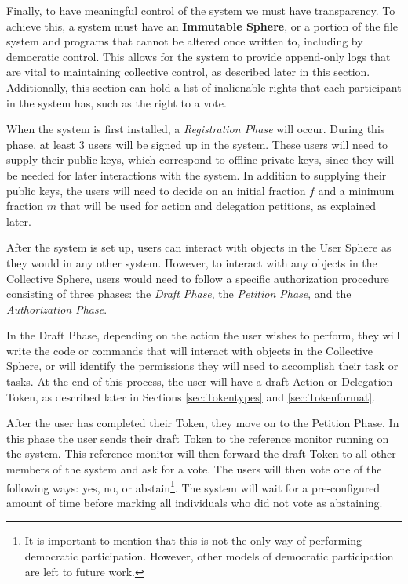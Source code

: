 Finally, to have meaningful control of the system we must have transparency. To
achieve this, a system must have an \textbf{Immutable Sphere}, or a portion of
the file system and programs that cannot be altered once written to, including
by democratic control. This allows for the system to provide append-only logs
that are vital to maintaining collective control, as described later in this
section. Additionally, this section can hold a list of inalienable rights that
each participant in the system has, such as the right to a vote.

When the system is first installed, a \textit{Registration Phase} will occur.
During this phase, at least 3 users will be signed up in the system. These users
will need to supply their public keys, which correspond to offline private keys,
since they will be needed for later interactions with the system. In addition to
supplying their public keys, the users will need to decide on an initial
fraction $f$ and a minimum fraction $m$ that will be used for action and
delegation petitions, as explained later.

After the system is set up, users can interact with objects in the User Sphere
as they would in any other system. However, to interact with any objects in the
Collective Sphere, users would need to follow a specific authorization
procedure consisting of three phases: the \textit{Draft Phase}, the 
\textit{Petition Phase}, and the \textit{Authorization Phase}.

In the Draft Phase, depending on the action the user wishes to perform, they
will write the code or commands that will interact with objects in the
Collective Sphere, or will identify the permissions they will need to accomplish
their task or tasks. At the end of this process, the user will have a draft
Action or Delegation Token, as described later in Sections \ref{sec:Tokentypes}
and \ref{sec:Tokenformat}.

After the user has completed their Token, they move on to the Petition Phase. In
this phase the user sends their draft Token to the reference monitor running on
the system. This reference monitor will then forward the draft Token to all
other members of the system and ask for a vote. The users will then vote one of
the following ways: yes, no, or abstain\footnote{It is important to mention that
this is not the only way of performing democratic participation. However, other
models of democratic participation are left to future work.}. The system will
wait for a pre-configured amount of time before marking all individuals who did not
vote as abstaining.

